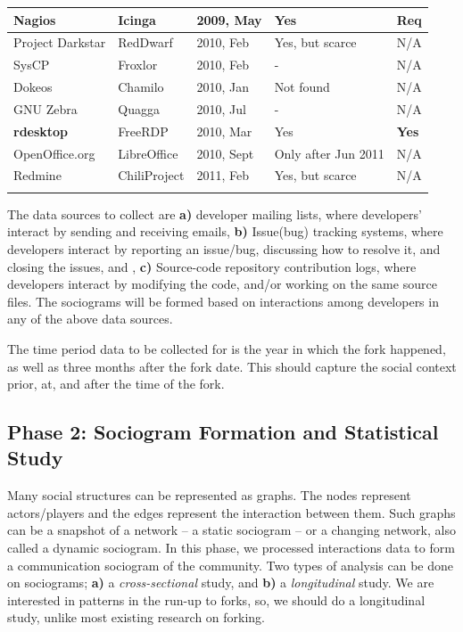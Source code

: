 \documentclass{acm_proc_article-sp}
\begin{document}
\begin{table} [!Ht]
\begin{tabular}{m{} m{} m{} m{} m{}}
Nagios & Icinga & 2009, May & Yes & Req \\ \hline
Project Darkstar& RedDwarf & 2010, Feb & Yes, but scarce & N/A \\ \hline
SysCP & Froxlor & 2010, Feb & - & N/A \\ \hline
Dokeos & Chamilo & 2010, Jan & Not found & N/A \\ \hline
GNU Zebra & Quagga & 2010, Jul & - & N/A \\ \hline
\textbf{rdesktop} & FreeRDP & 2010, Mar & Yes & \textbf{Yes} \\ \hline
OpenOffice.org & LibreOffice & 2010, Sept & Only after Jun 2011 & N/A \\ \hline
Redmine & ChiliProject & 2011, Feb & Yes, but scarce & N/A \\
\noalign{\smallskip}\hline
\end{tabular}
\end{table}


The data sources to collect are \textbf{a)} developer mailing lists, where developers' interact by sending and receiving emails, \textbf{b)} Issue(bug) tracking systems, where developers interact by reporting an issue/bug, discussing how to resolve it, and closing the issues, and , \textbf{c)} Source-code repository contribution logs, where developers interact by modifying the code, and/or working on the same source files. The sociograms will be formed based on interactions among developers in any of the above data sources.

The time period data to be collected for is the year in which the fork happened, as well as three months after the fork date. This should capture the social context prior, at, and after the time of the fork.

\subsection{Phase 2: Sociogram Formation and Statistical Study}

Many social structures can be represented as graphs. The nodes represent actors/players and the edges represent the interaction between them. Such graphs can be a snapshot of a network -- a static sociogram -- or a changing network, also called a dynamic sociogram. In this phase, we processed interactions data to form a communication sociogram of the community. Two types of analysis can be done on sociograms; \textbf{a)} a \textit{cross-sectional} study, and \textbf{b)} a \textit{longitudinal} study. We are interested in patterns in the run-up to forks, so, we should do a longitudinal study, unlike most existing research on forking.
\end{document}
